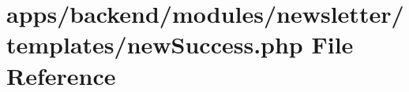 \hypertarget{backend_2modules_2newsletter_2templates_2new_success_8php}{\section{apps/backend/modules/newsletter/templates/new\-Success.php File Reference}
\label{backend_2modules_2newsletter_2templates_2new_success_8php}
}
